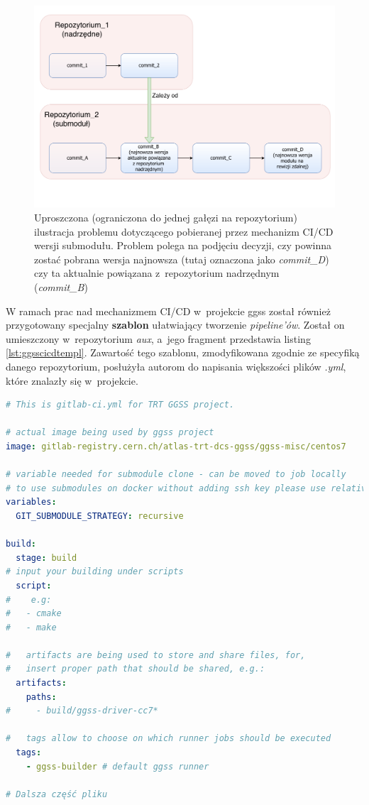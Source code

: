\begin{figure}[H]
\centering
\includegraphics[width=\textwidth]{res/SubmodulesProblem}
\caption{Uproszczona (ograniczona do jednej gałęzi na repozytorium) ilustracja problemu dotyczącego pobieranej przez mechanizm CI/CD wersji submodułu. Problem polega na podjęciu decyzji, czy powinna zostać pobrana wersja najnowsza (tutaj oznaczona jako \textit{commit\_D}) czy ta aktualnie powiązana z~repozytorium nadrzędnym (\textit{commit\_B})}
\label{fig:submoduleProblem}
\end{figure}

\newpage

W ramach prac nad mechanizmem CI/CD w~projekcie \gls*{ggss} został również przygotowany specjalny \textbf{szablon} ułatwiający tworzenie \textit{pipeline'ów}. Został on umieszczony w~repozytorium \textit{aux}, a~jego fragment przedstawia listing \ref{lst:ggsscicdtempl}. Zawartość tego szablonu, zmodyfikowana zgodnie ze specyfiką danego repozytorium, posłużyła autorom do napisania większości plików \textit{.yml}, które znalazły się w~projekcie.

\begin{lstlisting}[language=yaml, caption={Fragment szablonu ułatwiającego pisanie plików \textit{.gitlab-ci.yml} znajdującego się w~repozytorium \textit{aux}}, label={lst:ggsscicdtempl}]
# This is gitlab-ci.yml for TRT GGSS project.

# actual image being used by ggss project
image: gitlab-registry.cern.ch/atlas-trt-dcs-ggss/ggss-misc/centos7

# variable needed for submodule clone - can be moved to job locally
# to use submodules on docker without adding ssh key please use relative submodules path
variables:
  GIT_SUBMODULE_STRATEGY: recursive

build:
  stage: build
# input your building under scripts
  script:
#    e.g:
#   - cmake
#   - make

#   artifacts are being used to store and share files, for,
#   insert proper path that should be shared, e.g.:
  artifacts:
    paths:
#     - build/ggss-driver-cc7*

#   tags allow to choose on which runner jobs should be executed
  tags:
    - ggss-builder # default ggss runner

# Dalsza część pliku

\end{lstlisting}


